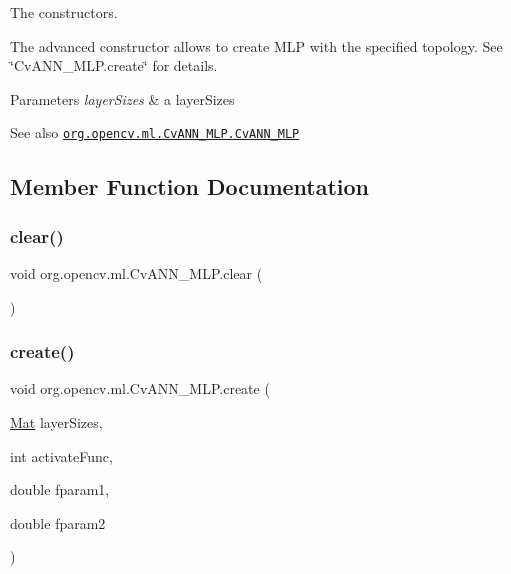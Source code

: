 The constructors.

The advanced constructor allows to create M\+LP with the specified topology. See \char`\"{}\+Cv\+A\+N\+N\+\_\+\+M\+L\+P.\+create\char`\"{} for details.


\begin{DoxyParams}{Parameters}
{\em layer\+Sizes} & a layer\+Sizes\\
\hline
\end{DoxyParams}
\begin{DoxySeeAlso}{See also}
\href{http://docs.opencv.org/modules/ml/doc/neural_networks.html#cvann-mlp-cvann-mlp}{\tt org.\+opencv.\+ml.\+Cv\+A\+N\+N\+\_\+\+M\+L\+P.\+Cv\+A\+N\+N\+\_\+\+M\+LP} 
\end{DoxySeeAlso}


\subsection{Member Function Documentation}
\mbox{\label{classorg_1_1opencv_1_1ml_1_1_cv_a_n_n___m_l_p_ac0470568d2d81e55c095df852e849b10}} 
\subsubsection{\texorpdfstring{clear()}{clear()}}
{\footnotesize\ttfamily void org.\+opencv.\+ml.\+Cv\+A\+N\+N\+\_\+\+M\+L\+P.\+clear (\begin{DoxyParamCaption}{ }\end{DoxyParamCaption})}

\mbox{\label{classorg_1_1opencv_1_1ml_1_1_cv_a_n_n___m_l_p_a907ad923ff5493dde694e49e8d02ca47}} 
\subsubsection{\texorpdfstring{create()}{create()}\hspace{0.1cm}{\footnotesize\ttfamily [1/2]}}
{\footnotesize\ttfamily void org.\+opencv.\+ml.\+Cv\+A\+N\+N\+\_\+\+M\+L\+P.\+create (\begin{DoxyParamCaption}\item[{\mbox{\hyperlink{classorg_1_1opencv_1_1core_1_1_mat}{Mat}}}]{layer\+Sizes,  }\item[{int}]{activate\+Func,  }\item[{double}]{fparam1,  }\item[{double}]{fparam2 }\end{DoxyParamCaption})}

